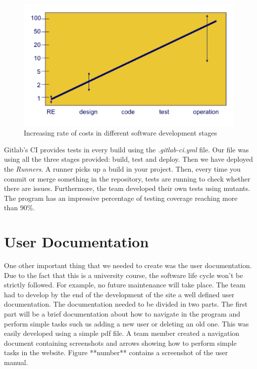\documentclass{l3proj}
\begin{document}
\begin{figure}
  \centerline{\includegraphics[width=\textwidth, height=\textheight, keepaspectratio]{costOfErrors.png}}
  \caption{Increasing rate of costs in different software development stages }
\end{figure}

 Gitlab's CI provides tests in every build using the \textit{.gitlab-ci.yml} file. Our file was using all the three stages provided: build, test and deploy. Then we have deployed the \textit{Runners}. A runner picks up a build in your project. Then, every time you commit or merge something in the repository, tests are running to check whether there are issues. Furthermore, the team developed their own tests using mutants. The program has an impressive percentage of testing coverage reaching more than 90\%. 










\section{User Documentation}
\label{sec:user_doc}

One other important thing that we needed to create was the user documentation. Due to the fact that this is a university course, the software life cycle won't be strictly followed. For example, no future maintenance will take place. The team had to develop by the end of the development of the site a well defined user documentation. The documentation needed to be divided in two parts. The first part will be a brief documentation about how to navigate in the program and perform simple tasks such us adding a new user or deleting an old one. This was easily developed using a simple pdf file. A team member created a navigation document containing screenshots and arrows showing how to perform simple tasks in the website. Figure **number** contains a screenshot of the user manual.
\end{document}
